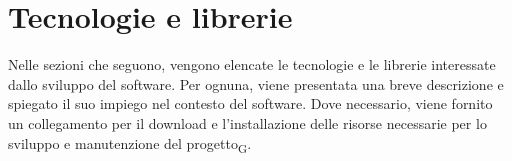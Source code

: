 \section{Tecnologie e librerie}

Nelle sezioni che seguono, vengono elencate le tecnologie e le librerie interessate dallo sviluppo del software. Per ognuna, viene presentata una breve descrizione e spiegato il suo impiego nel contesto del software. Dove necessario, viene fornito un collegamento per il download e l'installazione delle risorse necessarie per lo sviluppo e manutenzione del progetto\textsubscript{G}.




















